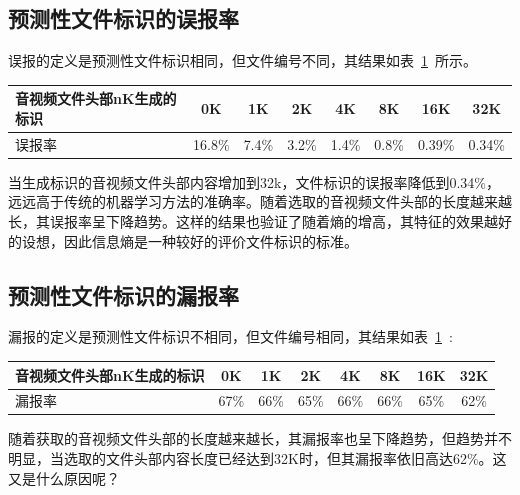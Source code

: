\subsection{预测性文件标识的误报率}

误报的定义是预测性文件标识相同，但文件编号不同，其结果如表~\ref{tab:Resultsoffalse}~所示。
\begin{table}[!htbp]
    \label{tab:Resultsoffalse}
    \centering
    \footnotesize%
    \setlength{\tabcolsep}{4pt}%
    \renewcommand{\arraystretch}{1.2}%
    \begin{tabular}{lccccccc}
        \hline
       音视频文件头部nK生成的标识&0K&1K&2K&4K&8K&16K&32K\\
        \hline
        误报率&16.8\%&7.4\%&3.2\%&1.4\%&0.8\%&0.39\%&0.34\%\\
        \hline
    \end{tabular}
\end{table}

当生成标识的音视频文件头部内容增加到32k，文件标识的误报率降低到0.34\%，远远高于传统的机器学习方法的准确率。随着选取的音视频文件头部的长度越来越长，其误报率呈下降趋势。这样的结果也验证了随着熵的增高，其特征的效果越好的设想，因此信息熵是一种较好的评价文件标识的标准。

\subsection{预测性文件标识的漏报率}
漏报的定义是预测性文件标识不相同，但文件编号相同，其结果如表~\ref{tab:Resultsoffalse}~:

\begin{table}[!htbp]
    \label{tab:ResultsofMissing}
    \centering
    \footnotesize%
    \setlength{\tabcolsep}{4pt}%
    \renewcommand{\arraystretch}{1.2}%
    \begin{tabular}{lccccccc}
        \hline
       音视频文件头部nK生成的标识&0K&1K&2K&4K&8K&16K&32K\\
        \hline
         漏报率&67\%&66\%&65\%&66\%&66\%&65\%&62\%\\
        \hline
    \end{tabular}
\end{table}

随着获取的音视频文件头部的长度越来越长，其漏报率也呈下降趋势，但趋势并不明显，当选取的文件头部内容长度已经达到32K时，但其漏报率依旧高达62\%。这又是什么原因呢？

